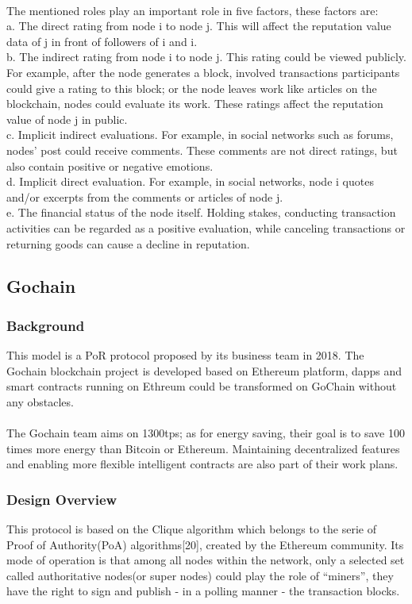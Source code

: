 \documentclass[doublespacing]{bmcart}
\begin{document}
\begin{CJK*}{UTF8}{gbsn}
	\paragraph{}
	The mentioned roles play an important role in five factors, these factors are:
	\\a. The direct rating from node i to node j. This will affect the reputation value data of j in front of followers of i and i.
	\\b. The indirect rating from node i to node j. This rating could be viewed publicly. For example, after the node generates a block, involved transactions participants could give a rating to this block; or the node leaves work like articles on the blockchain, nodes could evaluate its work. These ratings affect the reputation value of node j in public.
	\\c. Implicit indirect evaluations. For example, in social networks such as forums, nodes' post could receive comments. These comments are not direct ratings, but also contain positive or negative emotions.
	\\d. Implicit direct evaluation. For example, in social networks, node i quotes and/or excerpts from the comments or articles of node j.
	\\e. The financial status of the node itself. Holding stakes, conducting transaction activities can be regarded as a positive evaluation, while canceling transactions or returning goods can cause a decline in reputation.
	
\subsection{Gochain} 
\subsubsection*{Background} 
	This model is a PoR protocol proposed by its business team in 2018. The Gochain blockchain project is developed based on Ethereum platform, dapps and smart contracts running on Ethreum could be transformed on GoChain without any obstacles.
	\paragraph{} 
	The Gochain team aims on 1300tps; as for energy saving, their goal is to save 100 times more energy than Bitcoin or Ethereum. Maintaining decentralized features and enabling more flexible intelligent contracts are also part of their work plans.
	\subsubsection*{Design Overview} 
	 This protocol is based on the Clique algorithm which belongs to the serie of Proof of Authority(PoA) algorithms[20], created by the Ethereum community. Its mode of operation is that among all nodes within the network, only a selected set called authoritative nodes(or super nodes) could play the role of ``miners'', they have the right to sign and publish - in a polling manner - the transaction blocks.

\end{CJK*}
\end{document}
